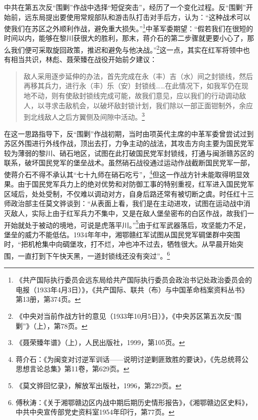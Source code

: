 中共在第五次反“围剿”作战中选择“短促突击”，经历了一个变化过程。反“围剿”开始前，远东局提出要使用常规部队和游击队打击对手后方，认为：“这种战术可以使我们在苏区之外顺利作战，避免重大损失。”\footnote{《共产国际执行委员会远东局给共产国际执行委员会政治书记处政治委员会的电报（1933年4月3日）》，《共产国际、联共（布）与中国革命档案资料丛书》第13册，第374页。}中革军委期望：“假若我们在很短的时间以内，能够在黎川获很大的胜利，那末，蒋介石的第二步骤就更要小心了，那么我们便可采取旋回政策，推迟和避免与他决战。”\footnote{《中央对当前作战方针的意见（1933年10月5日）》，《中央苏区第五次反“围剿”》（上），第78页。}这一点，其实在红军将领中也有相当共识，林彪、聂荣臻在战役开始前夕建议：

\begin{quote}

敌人采用逐步延伸的办法，首先完成在永（丰）吉（水）间之封锁线，然后再移其兵力，进行永（丰）乐（安）封锁线……在此情况下，如我军仍在现地不动，则有使敌封锁线完成可能，故我们意见，应以我们的行动调动敌人，以寻求击敌机会，以破坏敌封锁计划，我们除以一部正面钳制外，余应到北线敌人之后方翼侧及间隙中活动。\footnote{《聂荣臻年谱》（上），人民出版社，1999，第105页。}
\end{quote}


在这一思路指导下，反“围剿”作战初期，当时由项英代主席的中革军委曾尝试过到苏区外围进行外线作战，顶出去打，力争主动的战法，其攻击方向主要为国民党军较为薄弱的黎川、硝石地区，试图在此打破国民党军封锁线，打通与闽浙赣苏区的联系，破坏国民党军的堡垒战术。虽然硝石战役通过运动作战截断国民党军一部，使蒋介石不得不承认其“七十九师在硝石吃亏”，\footnote{蒋介石：《为闽变对讨逆军训话——说明讨逆剿匪致胜的要诀》，《先总统蒋公思想言论总集》第11卷，第629页。}但这一作战方针未能取得明显效果。由于国民党军兵力上的绝对优势和对防御工事的特别重视，红军进入国民党军区域后，处处受制，不仅难以调动对方，自身后路还常有被切断之虞。时任红十三师政治部主任莫文骅谈到：“从表面上看，我们是在主动进攻，试图在运动战中消灭敌人，实际上由于红军兵力不集中，又是在敌人堡垒密布的白区作战，故我们一开始就处于被动的境地，可说是虎落平川。”\footnote{《莫文骅回忆录》，解放军出版社，1996，第229页。}由于红军武器落后，攻坚能力不足，堡垒的威力不能低估。1934年年中，湘鄂赣红军试图从国民党军碉堡群中突围时，“把机枪集中向碉堡攻，打不烂，冲也冲不过去，牺牲很大。从早晨开始突围，一直打到下午快天黑，一道封锁线还没有突过”。\footnote{傅秋涛：《关于湘鄂赣边区内战中期后期历史情形报告》，《湘鄂赣边区史料》，中共中央宣传部党史资料室1954年印行，第77页。}


